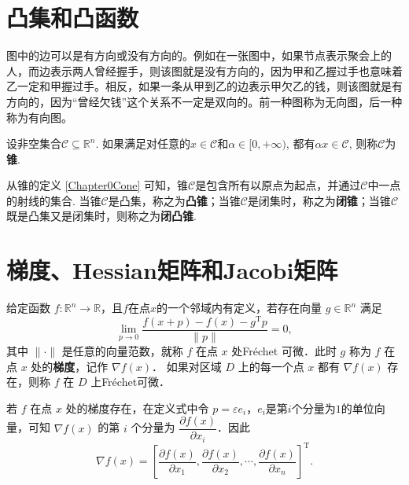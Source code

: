 \section{凸集和凸函数}
图中的边可以是有方向或没有方向的。例如在一张图中，如果节点表示聚会上的人，而边表示两人曾经握手，则该图就是没有方向的，因为甲和乙握过手也意味着乙一定和甲握过手。相反，如果一条从甲到乙的边表示甲欠乙的钱，则该图就是有方向的，因为“曾经欠钱”这个关系不一定是双向的。前一种图称为无向图，后一种称为有向图。

\begin{definition}\label{Chapter0Cone}
    设非空集合$\mathcal{C} \subseteq \mathbb{R}^{n}$. 如果满足对任意的$x \in \mathcal{C}$和$\alpha \in [0,+\infty)$, 都有$\alpha x \in \mathcal{C}$, 则称$\mathcal{C}$为\textbf{锥}.
\end{definition}

从锥的定义 \ref{Chapter0Cone} 可知，锥$\mathcal{C}$是包含所有以原点为起点，并通过$\mathcal{C}$中一点的射线的集合. 当锥$\mathcal{C}$是凸集，称之为\textbf{凸锥}；当锥$\mathcal{C}$是闭集时，称之为\textbf{闭锥}；当锥$\mathcal{C}$既是凸集又是闭集时，则称之为\textbf{闭凸锥}.

\section{梯度、Hessian矩阵和Jacobi矩阵}

\begin{definition}[梯度]
    给定函数 $f: \mathbb{R}^n \to \mathbb{R}$，且$f$在点$x$的一个邻域内有定义，若存在向量 $g \in \mathbb{R}^n$ 满足
	\begin{equation*}
	   \lim_{p \to 0} \frac{f(x+p) - f(x) - g^{\mathrm{T}} p}{\|p\|} = 0, 
	\end{equation*}
    其中 $\| \cdot \|$ 是任意的向量范数，就称 $f$ 在点 $x$ 处\textup{Fr\'{e}chet} 可微．此时 $g$ 称为 $f$ 在点 $x$ 处的\textbf{梯度}，记作 $\nabla f(x)$．
	如果对区域 $D$ 上的每一个点 $x$ 都有 $\nabla f(x)$ 存在，则称 $f$ 在 $D$ 上\textup{Fr\'{e}chet}可微．
\end{definition}

若 $f$ 在点 $x$ 处的梯度存在，在定义式中令 $p = \varepsilon e_i$，$e_i$是第$i$个分量为$1$的单位向量，可知 $\nabla f(x)$ 的第 $i$ 个分量为 $\dfrac{\partial f(x)}{\partial x_i}$．因此 
\begin{equation*}
   \nabla f(x) = \left[ \frac{\partial f(x)}{\partial x_1}, \frac{\partial f(x)}{\partial x_2}, \cdots, \frac{\partial f(x)}{\partial x_n} \right]^{\mathrm{T}}.
\end{equation*}
 
